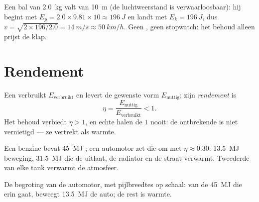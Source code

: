 \begin{example}\label{ex:g10:energy-conservation:fall}
Een bal van \qty{2.0}{kg} valt van \qty{10}{m} (de luchtweerstand is
verwaarloosbaar): hij begint met
$E_p = 2.0 \times 9.81 \times 10 \approx \qty{196}{J}$ en landt met
$E_k = \qty{196}{J}$, dus $v = \sqrt{2 \times 196/2.0} = \qty{14}{m/s}
\approx \qty{50}{km/h}$. Geen , geen stopwatch: het behoud
alleen prijst de klap.
\end{example}

\section{Rendement}

\begin{definition}[Rendement]\label{def:g10:energy-conservation:efficiency}
Een  verbruikt $E_{\text{verbruikt}}$ en levert de gewenste vorm
$E_{\text{nuttig}}$; zijn \emph{rendement} is
\[
\eta = \frac{E_{\text{nuttig}}}{E_{\text{verbruikt}}} < 1 .
\]
Het behoud verbiedt $\eta > 1$, en echte  halen de $1$ nooit:
de ontbrekende  is niet vernietigd --- ze vertrekt als warmte.
\end{definition}

\begin{example}\label{ex:g10:energy-conservation:engine}
Een  benzine bevat \qty{45}{MJ} ; een automotor
zet die om met $\eta \approx 0.30$: \qty{13.5}{MJ} beweging,
\qty{31.5}{MJ} die de uitlaat, de radiator en de straat verwarmt.
Tweederde van elke tank verwarmt de atmosfeer.
\end{example}

\begin{omfigure}

{\small De begroting van de automotor, met pijlbreedtes op schaal: van
de \qty{45}{MJ} die erin gaat, beweegt \qty{13.5}{MJ} de auto; de rest
is warmte.}
\end{omfigure}

